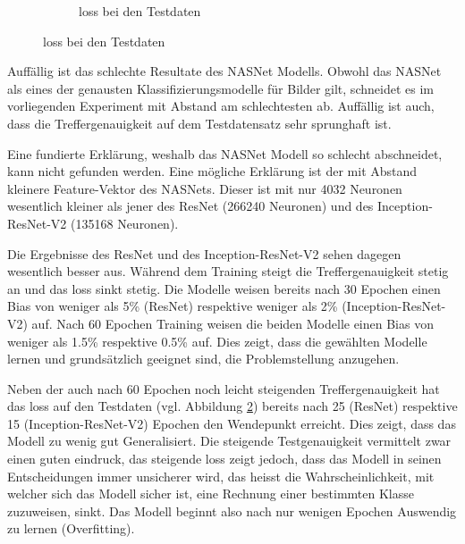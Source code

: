 \begin{figure}[h!]
\begin{subfigure}[b]{0.5\linewidth}
    \caption{loss bei den Testdaten} 
    \label{image-class-results:d} 
  \end{subfigure}
  \centering
\end{figure}



Auffällig ist das schlechte Resultate des NASNet Modells. Obwohl das NASNet als eines der genausten Klassifizierungsmodelle für Bilder gilt, schneidet es im vorliegenden Experiment mit Abstand am schlechtesten ab. Auffällig ist auch, dass die Treffergenauigkeit auf dem Testdatensatz sehr sprunghaft ist.

Eine fundierte Erklärung, weshalb das NASNet Modell so schlecht abschneidet, kann nicht gefunden werden. Eine mögliche Erklärung ist der mit Abstand kleinere Feature-Vektor des NASNets. Dieser ist mit nur 4032 Neuronen wesentlich kleiner als jener des ResNet (266240 Neuronen) und des Inception-ResNet-V2 (135168 Neuronen).

Die Ergebnisse des ResNet und des Inception-ResNet-V2 sehen dagegen wesentlich besser aus. Während dem Training steigt die Treffergenauigkeit stetig an und das loss sinkt stetig. Die Modelle weisen bereits nach 30 Epochen einen Bias von weniger als 5\% (ResNet) respektive weniger als 2\% (Inception-ResNet-V2) auf. Nach 60 Epochen Training weisen die beiden Modelle einen Bias von weniger als 1.5\% respektive 0.5\% auf. Dies zeigt, dass die gewählten Modelle lernen und grundsätzlich geeignet sind, die Problemstellung anzugehen. 

Neben der auch nach 60 Epochen noch leicht steigenden Treffergenauigkeit hat das loss auf den Testdaten (vgl. Abbildung \ref{image-class-results:d}) bereits nach 25 (ResNet) respektive 15 (Inception-ResNet-V2) Epochen den Wendepunkt erreicht. Dies zeigt, dass das Modell zu wenig gut Generalisiert. Die steigende Testgenauigkeit vermittelt zwar einen guten eindruck, das steigende loss zeigt jedoch, dass das Modell in seinen Entscheidungen immer unsicherer wird, das heisst die Wahrscheinlichkeit, mit welcher sich das Modell sicher ist, eine Rechnung einer bestimmten Klasse zuzuweisen, sinkt. Das Modell beginnt also nach nur wenigen Epochen Auswendig zu lernen (Overfitting).


